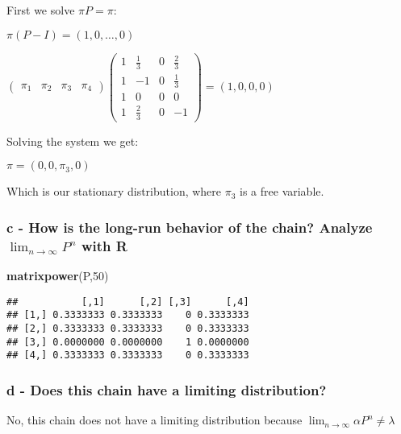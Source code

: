 \documentclass[]{article}
\newenvironment{Shaded}{\begin{snugshade}}{\end{snugshade}}
\newcommand{\DecValTok}[1]{\textcolor[rgb]{0.00,0.00,0.81}{#1}}
\newcommand{\KeywordTok}[1]{\textcolor[rgb]{0.13,0.29,0.53}{\textbf{#1}}}
\newcommand{\NormalTok}[1]{#1}
\begin{document}
First we solve \(\pi P = \pi\):

\(\pi (P-I) = (1,0, \dots, 0)\)

\(\begin{pmatrix} \pi_{1} & \pi_{2} & \pi_{3} & \pi_{4} \end{pmatrix} \begin{pmatrix} 1 & \frac{1}{3} & 0 & \frac{2}{3} \\ 1 & -1 & 0 & \frac{1}{3} \\ 1 & 0 & 0 & 0 \\ 1 & \frac{2}{3} & 0 & -1 \end{pmatrix} = (1,0,0,0)\)

Solving the system we get:

\(\pi = (0, 0, \pi_{3}, 0)\)

Which is our stationary distribution, where \(\pi_{3}\) is a free
variable.

\hypertarget{c---how-is-the-long-run-behavior-of-the-chain-analyze-lim_ntoinfty-pn-with-r}{%
\subsubsection{\texorpdfstring{c - How is the long-run behavior of the
chain? Analyze \(\lim_{n\to\infty} P^{n}\) with
R}{c - How is the long-run behavior of the chain? Analyze \textbackslash{}lim\_\{n\textbackslash{}to\textbackslash{}infty\} P\^{}\{n\} with R}}\label{c---how-is-the-long-run-behavior-of-the-chain-analyze-lim_ntoinfty-pn-with-r}}

\begin{Shaded}
\begin{Highlighting}[]
\KeywordTok{matrixpower}\NormalTok{(P,}\DecValTok{50}\NormalTok{)}
\end{Highlighting}
\end{Shaded}

\begin{verbatim}
##           [,1]      [,2] [,3]      [,4]
## [1,] 0.3333333 0.3333333    0 0.3333333
## [2,] 0.3333333 0.3333333    0 0.3333333
## [3,] 0.0000000 0.0000000    1 0.0000000
## [4,] 0.3333333 0.3333333    0 0.3333333
\end{verbatim}

\hypertarget{d---does-this-chain-have-a-limiting-distribution}{%
\subsubsection{d - Does this chain have a limiting
distribution?}\label{d---does-this-chain-have-a-limiting-distribution}}

No, this chain does not have a limiting distribution because
\(\lim_{n\to\infty} \alpha P^{n} \neq \lambda\)
\end{document}
